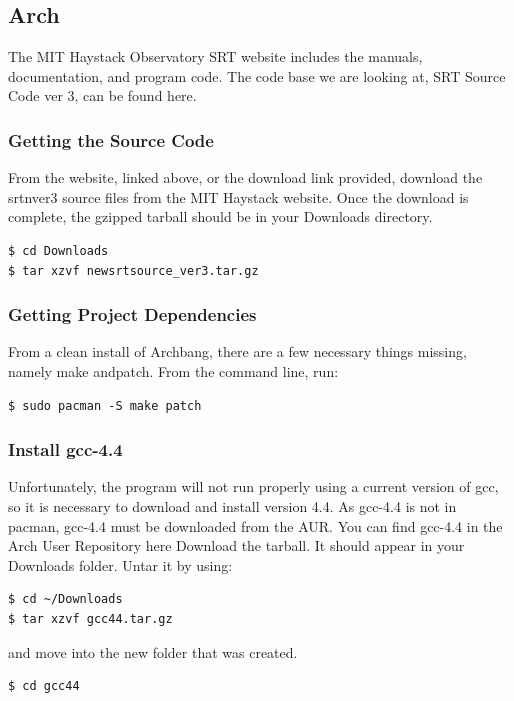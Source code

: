 \documentclass[11pt]{article} %
\begin{document}
\subsection{Arch}

The MIT Haystack Observatory SRT website includes the manuals, documentation, and program code. The code base we are looking at, SRT Source Code ver 3, can be found here.

\subsubsection{Getting the Source Code}
From the website, linked above, or the download link provided, download the srtnver3 source files from the MIT Haystack website. Once the download is complete, the gzipped tarball should be in your Downloads directory.

\begin{verbatim}
$ cd Downloads
$ tar xzvf newsrtsource_ver3.tar.gz
\end{verbatim}

\subsubsection{Getting Project Dependencies}
From a clean install of Archbang, there are a few necessary things missing, namely make andpatch.
From the command line, run:

\begin{verbatim}
$ sudo pacman -S make patch
\end{verbatim}

\subsubsection{Install gcc-4.4}
Unfortunately, the program will not run properly using a current version of gcc, so it is necessary to download and install version 4.4. As gcc-4.4 is not in pacman, gcc-4.4 must be downloaded from the AUR.
You can find gcc-4.4 in the Arch User Repository here
Download the tarball. It should appear in your Downloads folder. Untar it by using:

\begin{verbatim}
$ cd ~/Downloads
$ tar xzvf gcc44.tar.gz
\end{verbatim}

and move into the new folder that was created.

\begin{verbatim}
$ cd gcc44
\end{verbatim}
\end{document}
